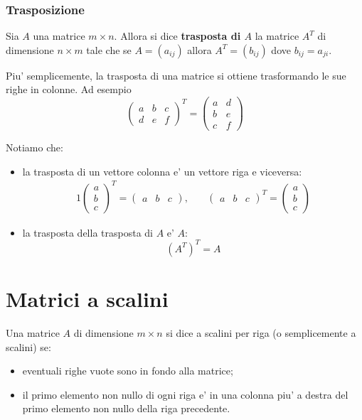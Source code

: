 \subsubsection{Trasposizione}

Sia $A$ una matrice $m \times n$. Allora si dice \textbf{trasposta di $A$} la matrice $A^T$ di dimensione $n \times m$ tale che se $A = (a_{ij})$ allora $A^T = (b_{ij})$ dove $b_{ij} = a_{ji}$. 

Piu' semplicemente, la trasposta di una matrice si ottiene trasformando le sue righe in colonne. Ad esempio
\[
    \begin{pmatrix}
        a & b & c \\ d & e & f 
    \end{pmatrix}^T = \begin{pmatrix}
        a & d \\ b & e \\ c & f
    \end{pmatrix}
\]

Notiamo che:
\begin{itemize}
    \item la trasposta di un vettore colonna e' un vettore riga e viceversa: \begin{alignat*}{1}
        \begin{pmatrix} a \\ b \\ c \end{pmatrix}^T = \begin{pmatrix}
            a & b & c
        \end{pmatrix}, \quad&
        \begin{pmatrix} a & b & c \end{pmatrix}^T = \begin{pmatrix}
            a \\ b \\ c
        \end{pmatrix}
    \end{alignat*}
    \item la trasposta della trasposta di $A$ e' $A$: \[(A^T)^T = A\]
\end{itemize}

\section{Matrici a scalini}

\begin{definition}
    Una matrice $A$ di dimensione $m \times n$ si dice a scalini per riga (o semplicemente a scalini) se:
    \begin{itemize}
        \item eventuali righe vuote sono in fondo alla matrice;
        \item il primo elemento non nullo di ogni riga e' in una colonna piu' a destra del primo elemento non nullo della riga precedente.
    \end{itemize}
\end{definition}

